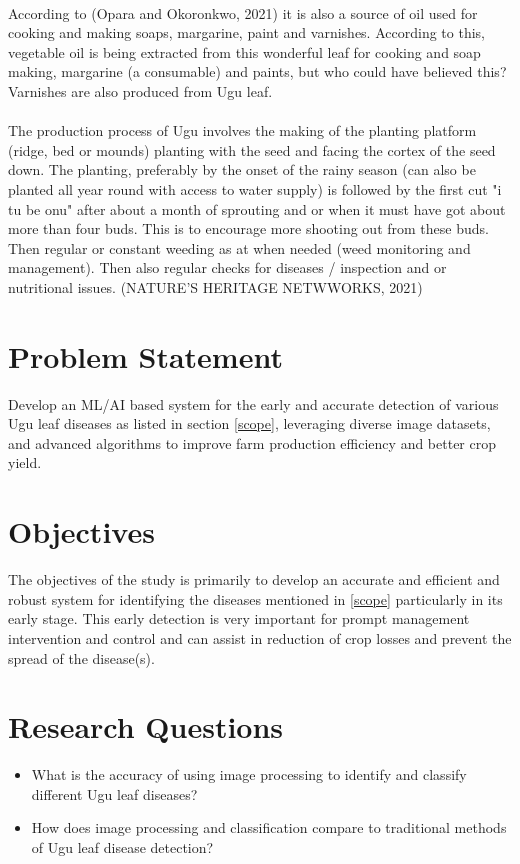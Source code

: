 \paragraph *{} 
According to (Opara and Okoronkwo, 2021) it is also a source of oil used for cooking and making soaps, margarine, paint and varnishes. According to this, vegetable oil is being extracted from this wonderful leaf for cooking and soap making, margarine (a consumable) and paints, but who could have believed this? Varnishes are also produced from Ugu leaf.

\paragraph*{}
The production process of Ugu involves the making of the planting platform (ridge, bed or mounds) planting with the seed and facing the cortex of the seed down. The planting, preferably by the onset of the rainy season (can also be planted all year round with access to water supply) is followed by the first cut  "i tu be onu" after about a month of sprouting and or when it must have got about more than four buds. This is to encourage more shooting out from these buds. Then regular or constant weeding as at when needed (weed monitoring and management). Then also regular checks for diseases / inspection and or nutritional issues. (NATURE'S HERITAGE NETWWORKS, 2021)

\section{Problem Statement}
Develop an ML/AI based system for the early and accurate detection of various Ugu leaf diseases as listed in section \ref{scope}, leveraging diverse image datasets, and advanced algorithms to improve farm production efficiency and better crop yield.

\section{Objectives}
The objectives of the study is primarily to develop an accurate and efficient and robust system for identifying the diseases mentioned in \ref{scope} particularly in its early stage. This early detection is very important for prompt management intervention and control and can assist in reduction of crop losses and prevent the spread of the disease(s).

\section{Research Questions}
\begin{itemize}
	\item What is the accuracy of using image processing to identify and classify different Ugu leaf diseases?
	\item How does image processing and classification compare to traditional methods of Ugu leaf disease detection?
\end{itemize}


